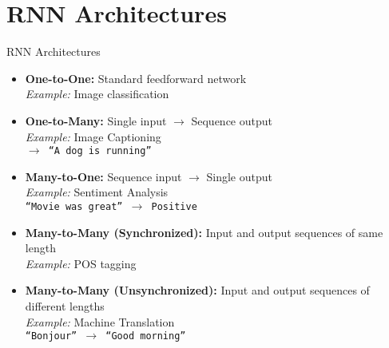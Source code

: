 \section{RNN Architectures}
\large
\begin{frame}[allowframebreaks]{RNN Architectures}
    \begin{itemize}
        \item \textbf{One-to-One:} Standard feedforward network \\[2em]
        \textit{Example:} Image classification
    \framebreak
        \item \textbf{One-to-Many:} Single input $\rightarrow$ Sequence output \\[2em]
        \textit{Example:} Image Captioning \\[2em]
        \texttt{$\rightarrow$ ``A dog is running''}
    \framebreak
        \item \textbf{Many-to-One:} Sequence input $\rightarrow$ Single output \\[2em]
        \textit{Example:} Sentiment Analysis \\[2em]
        \texttt{``Movie was great'' $\rightarrow$ Positive}
    \framebreak
        \item \textbf{Many-to-Many (Synchronized):} Input and output sequences of same length \\[2em]
        \textit{Example:} POS tagging
    \framebreak
        \item \textbf{Many-to-Many (Unsynchronized):} Input and output sequences of different lengths \\[2em]
        \textit{Example:} Machine Translation \\[2em]
        \texttt{``Bonjour'' $\rightarrow$ ``Good morning''}
    \end{itemize}
\end{frame}


